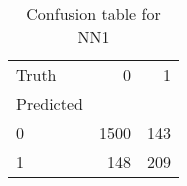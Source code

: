 \begin{table}[h!]
\caption{Confusion table for NN1}
\label{tab:NN1}
\begin{tabular}{lrr}
\toprule
Truth & 0 & 1 \\
Predicted &  &  \\
\midrule
0 & 1500 & 143 \\
1 & 148 & 209 \\
\bottomrule
\end{tabular}
\end{table}
